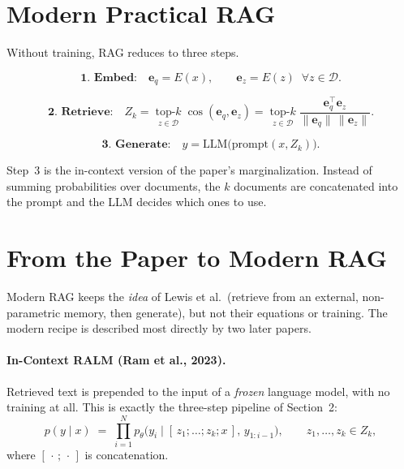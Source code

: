 \documentclass[11pt]{article}
\begin{document}
\section{Modern Practical RAG}

Without training, RAG reduces to three steps.

\begin{equation}
  \textbf{1. Embed:}\quad
  \mathbf{e}_q = E(x), \qquad
  \mathbf{e}_z = E(z)\;\; \forall z \in \mathcal{D}.
\end{equation}

\begin{equation}
  \textbf{2. Retrieve:}\quad
  Z_k = \operatorname*{top-\mathit{k}}_{z \in \mathcal{D}} \cos(\mathbf{e}_q, \mathbf{e}_z)
      = \operatorname*{top-\mathit{k}}_{z \in \mathcal{D}}
        \frac{\mathbf{e}_q^{\top}\mathbf{e}_z}{\lVert\mathbf{e}_q\rVert\,\lVert\mathbf{e}_z\rVert}.
\end{equation}

\begin{equation}
  \textbf{3. Generate:}\quad
  y = \mathrm{LLM}\big(\mathrm{prompt}(x, Z_k)\big).
\end{equation}

Step~3 is the in-context version of the paper's marginalization. Instead of summing probabilities over documents, the $k$ documents are concatenated into the prompt and the LLM decides which ones to use.

\section{From the Paper to Modern RAG}

Modern RAG keeps the \emph{idea} of Lewis et al.\ (retrieve from an external, non-parametric memory, then generate), but not their equations or training. The modern recipe is described most directly by two later papers.

\paragraph{In-Context RALM (Ram et al., 2023).}
Retrieved text is prepended to the input of a \emph{frozen} language model, with no training at all. This is exactly the three-step pipeline of Section~2:
\begin{equation}
  p(y \mid x) \;=\; \prod_{i=1}^{N} p_\theta\big(y_i \mid [\,z_1; \dots; z_k; x\,],\, y_{1:i-1}\big),
  \qquad z_1,\dots,z_k \in Z_k,
\end{equation}
where $[\,\cdot\,;\,\cdot\,]$ is concatenation.
\end{document}
